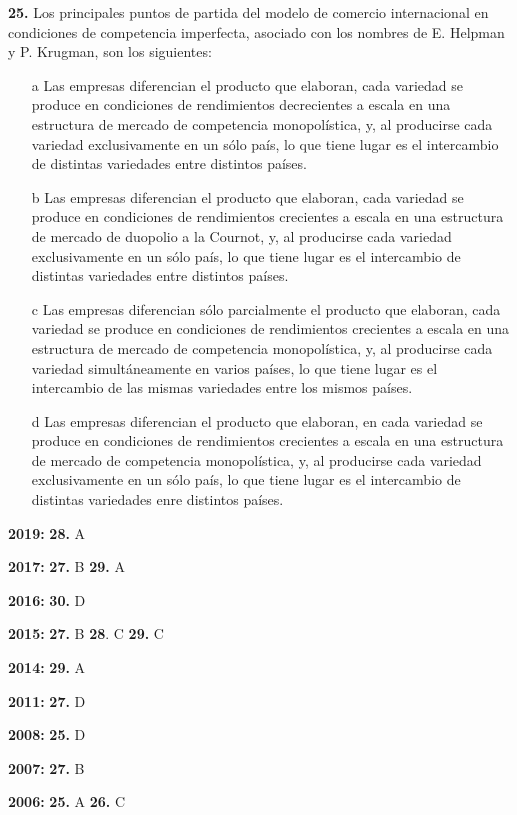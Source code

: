 \documentclass{nuevotema}
\begin{document}
\textbf{25.} Los principales puntos de partida del modelo de comercio internacional en condiciones de competencia imperfecta, asociado con los nombres de E. Helpman y P. Krugman, son los siguientes:
\begin{itemize}
	\item[a] Las empresas diferencian el producto que elaboran, cada variedad se produce en condiciones de rendimientos decrecientes a escala en una estructura de mercado de competencia monopolística, y, al producirse cada variedad exclusivamente en un sólo país, lo que tiene lugar es el intercambio de distintas variedades entre distintos países.
	\item[b] Las empresas diferencian el producto que elaboran, cada variedad se produce en condiciones de rendimientos crecientes a escala en una estructura de mercado de duopolio a la Cournot, y, al producirse cada variedad exclusivamente en un sólo país, lo que tiene lugar es el intercambio de distintas variedades entre distintos países. 
	\item[c] Las empresas diferencian sólo parcialmente el producto que elaboran, cada variedad se produce en condiciones de rendimientos crecientes a escala en una estructura de mercado de competencia monopolística, y, al producirse cada variedad simultáneamente en varios países, lo que tiene lugar es el intercambio de las mismas variedades entre los mismos países.
	\item[d] Las empresas diferencian el producto que elaboran, en cada variedad se produce en condiciones de rendimientos crecientes a escala en una estructura de mercado de competencia monopolística, y, al producirse cada variedad exclusivamente en un sólo país, lo que tiene lugar es el intercambio de distintas variedades enre distintos países.
\end{itemize}

\notas

\textbf{2019:} \textbf{28.} A

\textbf{2017:} \textbf{27.} B \textbf{29.} A

\textbf{2016:} \textbf{30.} D

\textbf{2015:} \textbf{27.} B \textbf{28}. C \textbf{29.} C 

\textbf{2014:} \textbf{29.} A 

\textbf{2011:} \textbf{27.} D

\textbf{2008:} \textbf{25.} D

\textbf{2007:} \textbf{27.} B

\textbf{2006:} \textbf{25.} A \textbf{26.} C
\end{document}

